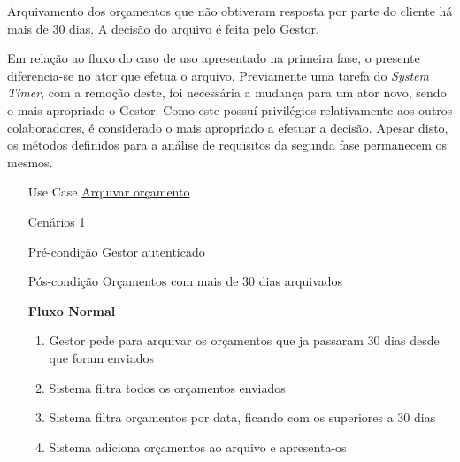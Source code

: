 \documentclass[../relatorio.tex]{subfiles}
\begin{document}
Arquivamento dos orçamentos que não obtiveram resposta por parte do cliente há mais de 30 dias.
A decisão do arquivo é feita pelo Gestor.

Em relação ao fluxo do caso de uso apresentado na primeira fase, o presente diferencia-se no ator 
que efetua o arquivo. 
Previamente uma tarefa do \textit{System Timer}, com a remoção deste, foi necessária a mudança para 
um ator novo, sendo o mais apropriado o Gestor.
Como este possuí privilégios relativamente aos outros colaboradores, é considerado o mais apropriado 
a efetuar a decisão.
Apesar disto, os métodos definidos para a análise de requisitos da segunda fase permanecem os mesmos.
\begin{itemize}
    \item[Use Case] {\underline{Arquivar orçamento}}
    \item[Cenários] {1}
    \item[Pré-condição] {Gestor autenticado}
    \item[Pós-condição] {Orçamentos com mais de 30 dias arquivados}
          \begin{flushleft}
              \textbf{Fluxo Normal}
          \end{flushleft}
          \begin{enumerate}
              \item Gestor pede para arquivar os orçamentos que ja passaram 30 dias desde que foram enviados
              \item Sistema filtra todos os orçamentos enviados
              \item Sistema filtra orçamentos por data, ficando com os superiores a 30 dias
              \item Sistema adiciona orçamentos ao arquivo e apresenta-os
          \end{enumerate}
\end{itemize}
\end{document}
